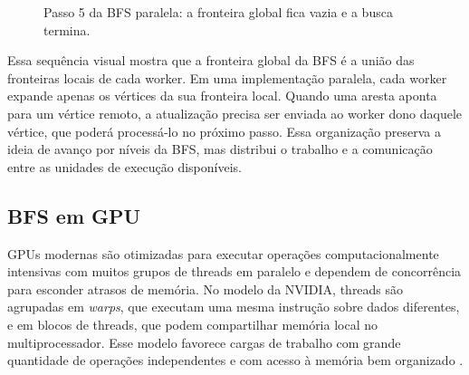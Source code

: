 \begin{figure}[H]
\centering
{}
\caption{Passo 5 da BFS paralela: a fronteira global fica vazia e a busca termina.}
\label{fig:bfs-paralela-step5}
\end{figure}

Essa sequência visual mostra que a fronteira global da BFS é a união das
fronteiras locais de cada worker. Em uma implementação paralela, cada worker
expande apenas os vértices da sua fronteira local. Quando uma aresta aponta para
um vértice remoto, a atualização precisa ser enviada ao worker dono daquele
vértice, que poderá processá-lo no próximo passo. Essa organização preserva a
ideia de avanço por níveis da BFS, mas distribui o trabalho e a comunicação entre
as unidades de execução disponíveis.

\subsection{BFS em GPU}
\label{sec:bfs-gpu}
GPUs modernas são otimizadas para executar operações computacionalmente intensivas 
com muitos grupos de threads em paralelo e dependem de concorrência para esconder 
atrasos de memória. No modelo da NVIDIA, threads são agrupadas em \textit{warps}, 
que executam uma mesma instrução sobre dados diferentes, e em blocos de threads, 
que podem compartilhar memória local no multiprocessador. Esse modelo favorece 
cargas de trabalho com grande quantidade de operações independentes e com acesso 
à memória bem organizado \cite{merrillgpu}.

